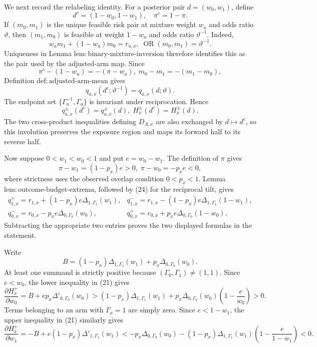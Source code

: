 We next record the relabeling identity.  For a posterior pair \(d=(w_0,w_1)\), define
\[
 d^c=(1-w_0,1-w_1),\quad \pi^c=1-\pi.
 \tag{22}
\]
If \((m_0,m_1)\) is the unique feasible risk pair at mixture weight \(w_a\) and odds ratio \(\vartheta\), then \((m_1,m_0)\) is feasible at weight \(1-w_a\) and odds ratio \(\vartheta^{-1}\).  Indeed,
\[
 w_am_1+(1-w_a)m_0=r_{a,x},
 \;
 \operatorname{OR}(m_0,m_1)=\vartheta^{-1}.
 \tag{23}
\]
Uniqueness in Lemma \(\mathrm{lem{:}binary\text{-}mixture\text{-}inversion}\) therefore identifies this as the pair used by the adjusted-arm map.  Since
\[
 \pi^c-(1-w_a)=-(\pi-w_a),
 \; m_0-m_1=-(m_1-m_0),
\]
Definition \(\mathrm{def{:}adjusted\text{-}arm\text{-}mean}\) gives
\[
 q_{a,x}(d^c;\vartheta^{-1})=q_{a,x}(d;\vartheta).
 \tag{24}
\]
The endpoint set \(\{\Gamma_a^{-1},\Gamma_a\}\) is invariant under reciprocation.  Hence
\[
 q_{a,x}^{\pm}(d^c)=q_{a,x}^{\pm}(d),
 \; H_x^{\pm}(d^c)=H_x^{\pm}(d).
 \tag{25}
\]
The two cross-product inequalities defining \(D_{A,x}\) are also exchanged by \(d\mapsto d^c\), so this involution preserves the exposure region and maps its forward half to its reverse half.

Now suppose \(0<w_1<w_0<1\) and put \(e=w_0-w_1\).  The definition of \(\pi\) gives
\[
 \pi-w_1=(1-p_x)e>0,
 \; \pi-w_0=-p_xe<0,
 \tag{26}
\]
where strictness uses the observed overlap condition \(0<p_x<1\).  Lemma \(\mathrm{lem{:}outcome\text{-}budget\text{-}extrema}\), followed by (24) for the reciprocal tilt, gives
\[
\begin{array}{ll}
q^+_{1,x}=r_{1,x}+(1-p_x)e\Delta_{1,\Gamma_1}(w_1),
&q^-_{1,x}=r_{1,x}-(1-p_x)e\Delta_{1,\Gamma_1}(1-w_1),\\
q^-_{0,x}=r_{0,x}-p_xe\Delta_{0,\Gamma_0}(w_0),
&q^+_{0,x}=r_{0,x}+p_xe\Delta_{0,\Gamma_0}(1-w_0).
\end{array}
\tag{27}
\]
Subtracting the appropriate two entries proves the two displayed formulas in the statement.

Write
\[
 B=(1-p_x)\Delta_{1,\Gamma_1}(w_1)
   +p_x\Delta_{0,\Gamma_0}(w_0).
\]
At least one summand is strictly positive because \((\Gamma_0,\Gamma_1)\neq(1,1)\).  Since \(e<w_0\), the lower inequality in (21) gives
\[
 \frac{\partial H_x^+}{\partial w_0}
 =B+ep_x\Delta'_{0,\Gamma_0}(w_0)
 >(1-p_x)\Delta_{1,\Gamma_1}(w_1)
   +p_x\Delta_{0,\Gamma_0}(w_0)\left(1-\frac e{w_0}\right)>0.
 \tag{28}
\]
Terms belonging to an arm with \(\Gamma_a=1\) are simply zero.  Since \(e<1-w_1\), the upper inequality in (21) similarly gives
\[
 \frac{\partial H_x^+}{\partial w_1}
 =-B+e(1-p_x)\Delta'_{1,\Gamma_1}(w_1)
 <-p_x\Delta_{0,\Gamma_0}(w_0)
  -(1-p_x)\Delta_{1,\Gamma_1}(w_1)
       \left(1-\frac e{1-w_1}\right)<0.
 \tag{29}
\]

